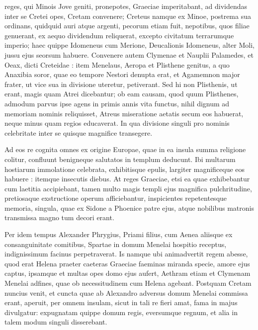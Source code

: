\documentclass{article}
\begin{document}
\begin{pages}
\begin{Rightside}
{} reges, qui Minois Jove geniti, pronepotes, Graeciae imperitabant, ad dividendas inter se Cretei opes, Cretam convenere; Creteus namque ex Minoe, postrema sua ordinans, quidquid auri atque argenti, pecorum etiam fuit, nepotibus, quos filiae genuerant, ex aequo dividendum reliquerat, excepto civitatum terrarumque imperio; haec quippe Idomeneus cum Merione, Deucalionis Idomeneus, alter Moli, jussu ejus seorsum habuere. Convenere autem Clymenae et Nauplii Palamedes, et Oeax, dicti Creteidae : item Menelaus, Aeropa et Plisthene genitus, a quo Anaxibia soror, quae eo tempore Nestori denupta erat, et Agamemnon major frater, ut vice sua in divisione uteretur, petiverant. Sed hi non Plisthenis, ut erant, magis quam Atrei dicebantur; ob eam causam, quod quum Plisthenes, admodum parvus ipse agens in primis annis vita functus, nihil dignum ad memoriam nominis reliquisset, Atreus miseratione aetatis secum eos habuerat, neque minus quam regios educaverat. In qua divisione singuli pro nominis celebritate inter se quisque magnifice transegere.

Ad eos re cognita omnes ex origine Europae, quae in ea insula summa religione colitur, confluunt benigneque salutatos in templum deducunt. Ibi multarum hostiarum immolatione celebrata, exhibitisque epulis, largiter magnificeque eos habuere : itemque insecutis diebus. At reges Graeciae, etsi ea quae exhibebantur cum laetitia accipiebant, tamen multo magis templi ejus magnifica pulchritudine, pretiosaque exstructione operum afficiebantur, inspicientes repetentesque memoria, singula, quae ex Sidone a Phoenice patre ejus, atque nobilibus matronis transmissa magno tum decori erant.

Per idem tempus Alexander Phrygius, Priami filius, cum Aenea aliisque ex consanguinitate comitibus, Spartae in domum Menelai hospitio receptus, indignissimum facinus perpetraverat. Is namque ubi animadvertit regem abesse, quod erat Helena praeter caeteras Graeciae faeminas miranda specie, amore ejus captus, ipsamque et multas opes domo ejus aufert, Aethram etiam et Clymenam Menelai adfines, quae ob necessitudinem cum Helena agebant. Postquam Cretam nuncius venit, et cuncta quae ab Alexandro adversus domum Menelai commissa erant, aperuit, per omnem insulam, sicut in tali re fieri amat, fama in majus divulgatur: expugnatam quippe domum regis, eversumque regnum, et alia in talem modum singuli disserebant.



\end{Rightside}
\end{pages}
\end{document}
